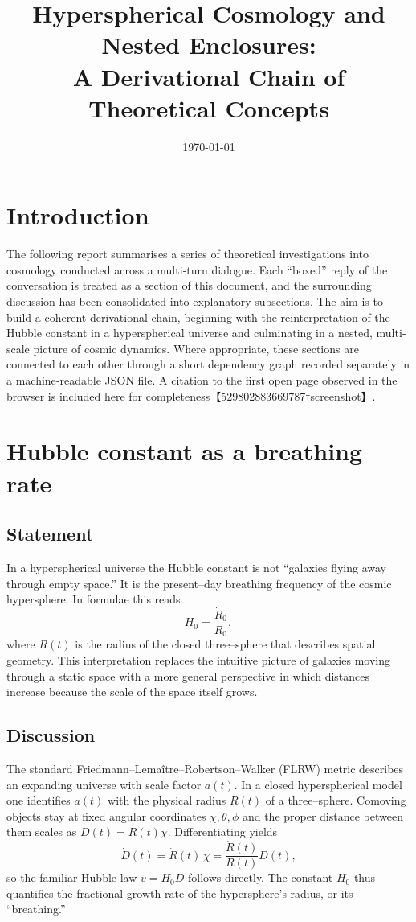 \documentclass{article}
\title{Hyperspherical Cosmology and Nested Enclosures:\\A Derivational Chain of Theoretical Concepts}
\author{}
\date{\today}
\begin{document}
\maketitle

\section{Introduction}
The following report summarises a series of theoretical investigations into cosmology conducted across a multi‐turn dialogue.  Each ``boxed'' reply of the conversation is treated as a section of this document, and the surrounding discussion has been consolidated into explanatory subsections.  The aim is to build a coherent derivational chain, beginning with the reinterpretation of the Hubble constant in a hyperspherical universe and culminating in a nested, multi‐scale picture of cosmic dynamics.  Where appropriate, these sections are connected to each other through a short dependency graph recorded separately in a machine‐readable JSON file.  A citation to the first open page observed in the browser is included here for completeness【529802883669787†screenshot】.

\section{Hubble constant as a breathing rate}
\label{sec:breathing}
\subsection{Statement}
In a hyperspherical universe the Hubble constant is not ``galaxies flying away through empty space.''  It is the present–day breathing frequency of the cosmic hypersphere.  In formulae this reads
\[
H_0 = \frac{\dot{R}_0}{R_0},
\]
where $R(t)$ is the radius of the closed three–sphere that describes spatial geometry.  This interpretation replaces the intuitive picture of galaxies moving through a static space with a more general perspective in which distances increase because the scale of the space itself grows.

\subsection{Discussion}
The standard Friedmann–Lemaître–Robertson–Walker (FLRW) metric describes an expanding universe with scale factor $a(t)$.  In a closed hyperspherical model one identifies $a(t)$ with the physical radius $R(t)$ of a three–sphere.  Comoving objects stay at fixed angular coordinates $\chi,\theta,\phi$ and the proper distance between them scales as $D(t) = R(t)\chi$.  Differentiating yields
\[\dot{D}(t) = \dot{R}(t)\,\chi = \frac{\dot{R}(t)}{R(t)} D(t),\]
so the familiar Hubble law $v=H_0D$ follows directly.  The constant $H_0$ thus quantifies the fractional growth rate of the hypersphere’s radius, or its ``breathing.''
\end{document}
